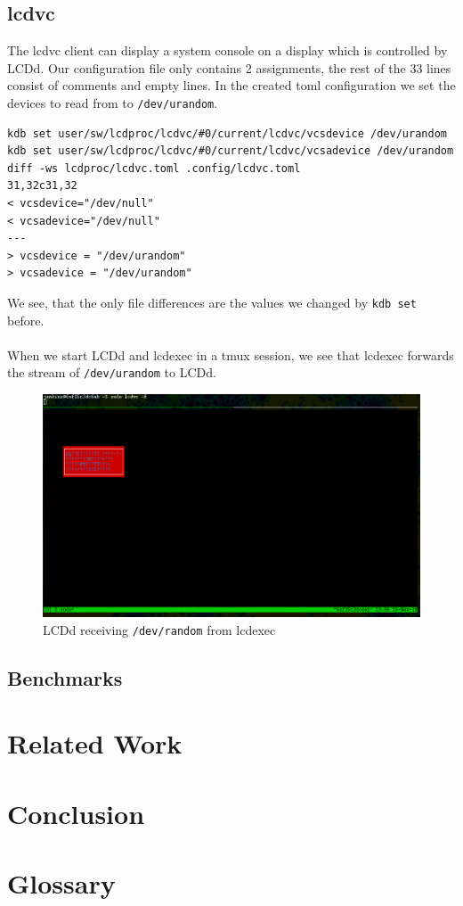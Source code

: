 \documentclass[12pt]{report}
\begin{document}
\section{lcdvc}
The lcdvc client can display a system console on a display which is controlled by LCDd.
Our configuration file only contains 2 assignments, the rest of the 33 lines consist of comments and empty lines.
In the created \acrshort{toml} configuration we set the devices to read from to \texttt{/dev/urandom}.
{\small
\begin{verbatim}
kdb set user/sw/lcdproc/lcdvc/#0/current/lcdvc/vcsdevice /dev/urandom
kdb set user/sw/lcdproc/lcdvc/#0/current/lcdvc/vcsadevice /dev/urandom
diff -ws lcdproc/lcdvc.toml .config/lcdvc.toml
31,32c31,32
< vcsdevice="/dev/null"
< vcsadevice="/dev/null"
---
> vcsdevice = "/dev/urandom"
> vcsadevice = "/dev/urandom"
\end{verbatim}
}
We see, that the only file differences are the values we changed by \texttt{kdb set} before.
\\\\
When we start LCDd and lcdexec in a \acrshort{tmux} session, we see that lcdexec forwards the stream of \texttt{/dev/urandom} to LCDd.
\FloatBarrier
\begin{figure}[h!]
	\centering
		\includegraphics[width=\linewidth]{lcdvc.png}
  \caption{LCDd receiving \texttt{/dev/random} from lcdexec}
\label{fig:lcdvc}
\end{figure}
\FloatBarrier


\section{Benchmarks}


\chapter{Related Work}

\chapter{Conclusion}

\chapter{Glossary}

\printglossary[type=\acronymtype]

{}

\end{document}
